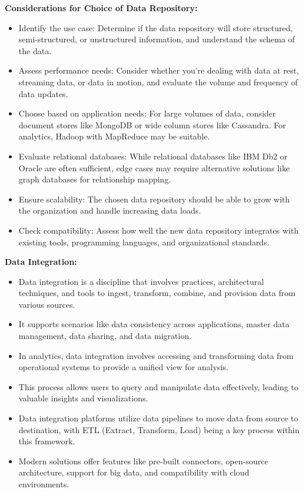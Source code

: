 \documentclass[12pt]{report} %
\begin{document}
		\noindent \textbf{Considerations for Choice of Data Repository:}
		\begin{itemize}
			\item Identify the use case: Determine if the data repository will store structured, semi-structured, or unstructured information, and understand the schema of the data.
			\item Assess performance needs: Consider whether you're dealing with data at rest, streaming data, or data in motion, and evaluate the volume and frequency of data updates.
			\item Choose based on application needs: For large volumes of data, consider document stores like MongoDB or wide column stores like Cassandra. For analytics, Hadoop with MapReduce may be suitable.
			\item Evaluate relational databases: While relational databases like IBM Db2 or Oracle are often sufficient, edge cases may require alternative solutions like graph databases for relationship mapping.
			\item Ensure scalability: The chosen data repository should be able to grow with the organization and handle increasing data loads.
			\item Check compatibility: Assess how well the new data repository integrates with existing tools, programming languages, and organizational standards.
		\end{itemize}
	
		\noindent \textbf{Data Integration:}
		\begin{itemize}
			\item Data integration is a discipline that involves practices, architectural techniques, and tools to ingest, transform, combine, and provision data from various sources.
			\item It supports scenarios like data consistency across applications, master data management, data sharing, and data migration.
			\item In analytics, data integration involves accessing and transforming data from operational systems to provide a unified view for analysis.
			\item This process allows users to query and manipulate data effectively, leading to valuable insights and visualizations.
			\item Data integration platforms utilize data pipelines to move data from source to destination, with ETL (Extract, Transform, Load) being a key process within this framework.
			\item Modern solutions offer features like pre-built connectors, open-source architecture, support for big data, and compatibility with cloud environments.
		\end{itemize}
	
\end{document}
